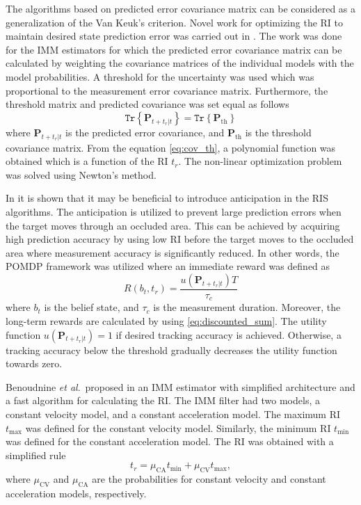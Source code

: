 \documentclass[english, 12pt, a4paper, elec, utf8, a-1b, online]{aaltothesis}
\renewcommand{\vec}[1]{\mathbf{#1}}
\newcommand{\tr}[1]{\texttt{Tr}\left\{ #1 \right\}}
\newcommand{\etal}{\textit{et al}.~}
\newcommand{\tmax}{t_\text{max}}
\newcommand{\tmin}{t_\text{min}}
\newcommand{\muca}{\mu_{\text{CA}}}
\newcommand{\mucv}{\mu_{\text{CV}}}
\begin{document}
The algorithms based on predicted error covariance matrix can be considered as a generalization of the Van Keuk's criterion.  
Novel work for optimizing the RI to maintain desired state prediction error was carried out in \cite{Watson1993}.
The work was done for the IMM estimators for which the predicted error covariance matrix can be calculated by weighting the covariance matrices of the individual models with the model probabilities.
A threshold for the uncertainty was used which was proportional to the measurement error covariance matrix.
Furthermore, the threshold matrix and predicted covariance was set equal as follows  
\begin{equation}\label{eq:cov_th}
    \tr{ \vec{P}_{t+t_r|t} } = \tr{ \vec{P}_{\text{th}} }
\end{equation}
where $\vec{P}_{t+t_r|t}$ is the predicted error covariance, and $\vec{P}_{\text{th}}$ is the threshold covariance matrix.
From the equation \eqref{eq:cov_th}, a polynomial function was obtained which is a function of the RI $t_r$.
The non-linear optimization problem was solved using Newton's method.



In \cite{Charlish2015} it is shown that it may be beneficial to introduce anticipation in the RIS algorithms.
The anticipation is utilized to prevent large prediction errors when the target moves through an occluded area.
This can be achieved by acquiring high prediction accuracy by using low RI before the target moves to the occluded area where measurement accuracy is significantly reduced.
In other words, the POMDP framework was utilized where an immediate reward was defined as
\begin{equation}
    R(b_t, t_r) = \frac{u\left(\vec{P}_{t+t_r|t} \right) T}{\tau_c}
\end{equation}
where $b_t$ is the belief state, and $\tau_c$ is the measurement duration.
Moreover, the long-term rewards are calculated by using \eqref{eq:discounted_sum}.
The utility function $u\left(\vec{P}_{t+t_r|t} \right)=1$ if desired tracking accuracy is achieved.
Otherwise, a tracking accuracy below the threshold gradually decreases the utility function towards zero.


Benoudnine \etal proposed in \cite{Benoudnine2006} an IMM estimator with simplified architecture and a fast algorithm for calculating the RI.
The IMM filter had two models, a constant velocity model, and a constant acceleration model.
The maximum RI $\tmax$ was defined for the constant velocity model.
Similarly, the minimum RI $\tmin$ was defined for the constant acceleration model.
The RI was obtained with a simplified rule
\begin{equation}\label{eq:fimm}
    t_r = \muca \tmin + \mucv \tmax,
\end{equation}
where $\mucv$ and $\muca$ are the probabilities for constant velocity and constant acceleration models, respectively.
\end{document}
